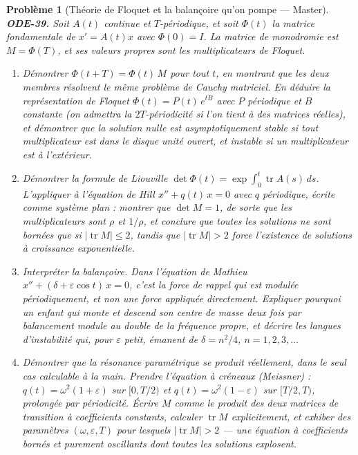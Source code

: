 \documentclass[11pt]{article}
\newtheorem{problem}{Problème}
\begin{document}
\begin{problem}[{Théorie de Floquet et la balançoire qu'on pompe --- Master}]
\textbf{ODE-39.} Soit $ A(t) $ continue et $ T $-périodique, et soit $ \Phi(t) $ la
matrice fondamentale de $ x' = A(t)x $ avec $ \Phi(0) = I $. La \textit{matrice de monodromie}
est $ M = \Phi(T) $, et ses valeurs propres sont les \textit{multiplicateurs de Floquet}.
\begin{enumerate}
\item[(a)] Démontrer $ \Phi(t + T) = \Phi(t)\,M $ pour tout $ t $, en montrant que les deux membres
résolvent le même problème de Cauchy matriciel. En déduire la représentation de Floquet
$ \Phi(t) = P(t)\,e^{tB} $ avec $ P $ périodique et $ B $ constante (on admettra la
$ 2T $-périodicité si l'on tient à des matrices réelles), et démontrer que la solution nulle est
asymptotiquement stable si tout multiplicateur est dans le disque unité ouvert, et instable si un
multiplicateur est à l'extérieur.
\item[(b)] Démontrer la formule de Liouville
$ \det \Phi(t) = \exp \int_0^t \operatorname{tr} A(s)\,ds $. L'appliquer à l'équation de Hill
$ x'' + q(t)\,x = 0 $ avec $ q $ périodique, écrite comme système plan : montrer que
$ \det M = 1 $, de sorte que les multiplicateurs sont $ \rho $ et $ 1/\rho $, et conclure que
toutes les solutions ne sont bornées que si $ |\operatorname{tr} M| \le 2 $, tandis que
$ |\operatorname{tr} M| > 2 $ force l'existence de solutions à croissance
exponentielle.
\item[(c)] Interpréter la balançoire. Dans l'équation de Mathieu
$ x'' + (\delta + \varepsilon \cos t)\,x = 0 $, c'est la force de rappel qui est modulée
périodiquement, et non une force appliquée directement. Expliquer pourquoi un enfant qui monte et
descend son centre de masse deux fois par balancement module au double de la fréquence propre, et
décrire les langues d'instabilité qui, pour $ \varepsilon $ petit, émanent de
$ \delta = n^2/4 $, $ n = 1, 2, 3, \ldots $
\item[(d)] Démontrer que la résonance paramétrique se produit réellement, dans le seul cas calculable à
la main. Prendre l'équation à créneaux (Meissner) : $ q(t) = \omega^2(1 + \varepsilon) $ sur
$ [0, T/2) $ et $ q(t) = \omega^2(1 - \varepsilon) $ sur $ [T/2, T) $, prolongée par
périodicité. Écrire $ M $ comme le produit des deux matrices de transition à coefficients
constants, calculer $ \operatorname{tr} M $ explicitement, et exhiber des paramètres
$ (\omega, \varepsilon, T) $ pour lesquels $ |\operatorname{tr} M| > 2 $ --- une équation à
coefficients bornés et purement oscillants dont toutes les solutions explosent.
\end{enumerate}

\end{problem}
\end{document}
